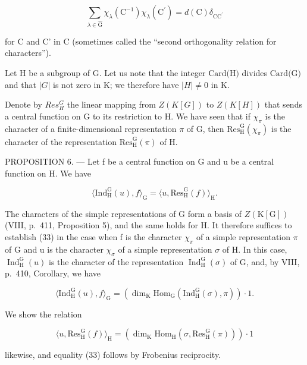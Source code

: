\[
\sum_ {\lambda \in \widehat {\mathrm{G}}} \chi_ {\lambda} (\mathrm{C} ^ {- 1}) \chi_ {\lambda} (\mathrm{C} ^ {\prime}) = d (\mathrm{C}) \delta_ {\mathrm{CC} ^ {\prime}}\tag{32}
\]

for C and C' in C (sometimes called the ``second orthogonality relation for characters'').

Let H be a subgroup of G. Let us note that the integer \(\text{Card(H)}\) divides \(\text{Card(G)}\) and that \(|G|\) is not zero in K; we therefore have \(|H| \neq 0\) in K.

Denote by \(Res_{H}^{G}\) the linear mapping from \(Z(K[G])\) to \(Z(K[H])\) that sends a central function on G to its restriction to H. We have seen that if \(\chi_{\pi}\) is the character of a finite-dimensional representation \(\pi\) of G, then \(\mathrm{Res}_{\mathrm{H}}^{\mathrm{G}}(\chi_{\pi})\) is the character of the representation \(\mathrm{Res}_{\mathrm{H}}^{\mathrm{G}}(\pi)\) of H.

PROPOSITION 6. --- Let f be a central function on G and u be a central function on H. We have

\[
\langle \mathrm{Ind} _ {\mathrm{H}} ^ {\mathrm{G}} (u), f \rangle_ {\mathrm{G}} = \langle u, \mathrm{Res} _ {\mathrm{H}} ^ {\mathrm{G}} (f) \rangle_ {\mathrm{H}}.\tag{33}
\]

The characters of the simple representations of G form a basis of \(Z(\mathrm{K}[\mathrm{G}])\) (VIII, p.~411, Proposition 5), and the same holds for H. It therefore suffices to establish (33) in the case when f is the character \(\chi_{\pi}\) of a simple representation \(\pi\) of G and u is the character \(\chi_{\sigma}\) of a simple representation \(\sigma\) of H. In this case, \(\operatorname{Ind}_{\mathrm{H}}^{\mathrm{G}}(u)\) is the character of the representation \(\operatorname{Ind}_{\mathrm{H}}^{\mathrm{G}}(\sigma)\) of G, and, by VIII, p.~410, Corollary, we have

\[
\langle \mathrm{Ind} _ {\mathrm{H}} ^ {\mathrm{G}} (u), f \rangle_ {\mathrm{G}} = (\dim_ {\mathrm{K}} \mathrm{Hom} _ {\mathrm{G}} (\mathrm{Ind} _ {\mathrm{H}} ^ {\mathrm{G}} (\sigma), \pi)) \cdot 1.
\]

We show the relation

\[
\langle u, \mathrm{Res} _ {\mathrm{H}} ^ {\mathrm{G}} (f) \rangle_ {\mathrm{H}} = (\dim_ {\mathrm{K}} \mathrm{Hom} _ {\mathrm{H}} (\sigma , \mathrm{Res} _ {\mathrm{H}} ^ {\mathrm{G}} (\pi))) \cdot 1
\]

likewise, and equality (33) follows by Frobenius reciprocity.

